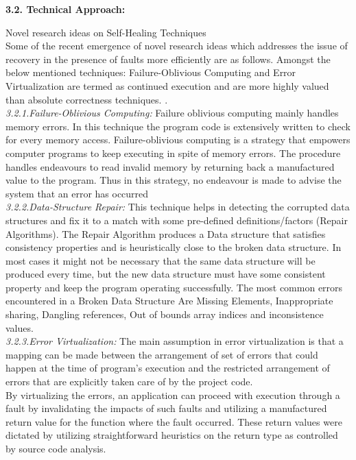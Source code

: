 \textbf{3.2. Technical Approach:\\}

Novel research ideas on Self-Healing Techniques\\

Some of the recent emergence of novel research ideas which addresses the issue of recovery in the presence of faults more efficiently are as follows. Amongst the below mentioned techniques: Failure-Oblivious Computing and Error Virtualization are termed as continued execution and are more highly valued than absolute correctness techniques.
\cite{Keromytis:SelfHealingSurvey:2011}.\\

\textit{3.2.1.Failure-Oblivious Computing:}
Failure oblivious computing mainly handles memory errors. In this technique the program code is extensively written to check for every memory access.
Failure-oblivious computing is a strategy that empowers computer programs to keep executing in spite of memory errors. The procedure handles endeavours to read invalid memory by returning back a manufactured value to the program. Thus in this strategy, no endeavour is made to advise the system that an error has occurred\\

\textit{3.2.2.Data-Structure Repair: }
This technique helps in detecting the corrupted data structures and fix it to a match with some pre-defined definitions/factors (Repair Algorithms). The Repair Algorithm produces a Data structure that satisfies consistency properties and is heuristically close to the broken data structure. In most cases it might not be necessary that the same data structure will be produced every time, but the new data structure must have some consistent property and keep the program operating successfully. The most common errors encountered in a Broken Data Structure Are Missing Elements, Inappropriate sharing, Dangling references, Out of bounds array indices and inconsistence values.\\
 
\textit{3.2.3.Error Virtualization: }
The main assumption in error virtualization is that a mapping can be made between the arrangement of set of errors that could happen at the time of program's execution and the restricted arrangement of errors that are explicitly taken care of by the project code.\\ 

By virtualizing the errors, an application can proceed with execution through a fault by invalidating the impacts of such faults and utilizing a manufactured return value for the function where the fault occurred. These return values were dictated by utilizing straightforward heuristics on the return type as controlled by source code analysis.\\

